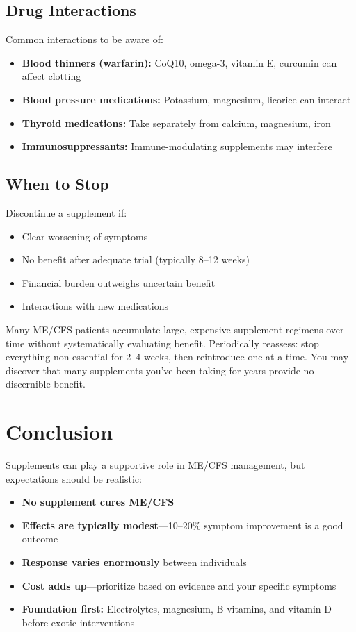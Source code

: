 \subsection{Drug Interactions}

Common interactions to be aware of:
\begin{itemize}
    \item \textbf{Blood thinners (warfarin):} CoQ10, omega-3, vitamin E, curcumin can affect clotting
    \item \textbf{Blood pressure medications:} Potassium, magnesium, licorice can interact
    \item \textbf{Thyroid medications:} Take separately from calcium, magnesium, iron
    \item \textbf{Immunosuppressants:} Immune-modulating supplements may interfere
\end{itemize}

\subsection{When to Stop}

Discontinue a supplement if:
\begin{itemize}
    \item Clear worsening of symptoms
    \item No benefit after adequate trial (typically 8--12 weeks)
    \item Financial burden outweighs uncertain benefit
    \item Interactions with new medications
\end{itemize}

\begin{observation}
Many ME/CFS patients accumulate large, expensive supplement regimens over time without systematically evaluating benefit. Periodically reassess: stop everything non-essential for 2--4 weeks, then reintroduce one at a time. You may discover that many supplements you've been taking for years provide no discernible benefit.
\end{observation}


\section{Conclusion}

Supplements can play a supportive role in ME/CFS management, but expectations should be realistic:
\begin{itemize}
    \item \textbf{No supplement cures ME/CFS}
    \item \textbf{Effects are typically modest}---10--20\% symptom improvement is a good outcome
    \item \textbf{Response varies enormously} between individuals
    \item \textbf{Cost adds up}---prioritize based on evidence and your specific symptoms
    \item \textbf{Foundation first:} Electrolytes, magnesium, B vitamins, and vitamin D before exotic interventions
\end{itemize}

